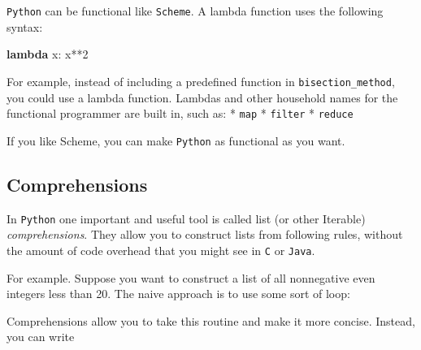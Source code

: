 \documentclass{article}
\newenvironment{Shaded}{}{}
\newcommand{\KeywordTok}[1]{\textcolor[rgb]{0.00,0.44,0.13}{\textbf{{#1}}}}
\newcommand{\DataTypeTok}[1]{\textcolor[rgb]{0.56,0.13,0.00}{{#1}}}
\newcommand{\DecValTok}[1]{\textcolor[rgb]{0.25,0.63,0.44}{{#1}}}
\newcommand{\NormalTok}[1]{{#1}}
\begin{document}
\texttt{Python} can be functional like \texttt{Scheme}. A lambda
function uses the following syntax:

\begin{Shaded}
\begin{Highlighting}[]
   \KeywordTok{lambda} \NormalTok{x: x**}\DecValTok{2}
\end{Highlighting}
\end{Shaded}

For example, instead of including a predefined function in
\texttt{bisection\_method}, you could use a lambda function. Lambdas and
other household names for the functional programmer are built in, such
as: * \texttt{map} * \texttt{filter} * \texttt{reduce}

If you like Scheme, you can make \texttt{Python} as functional as you
want.

\subsection{Comprehensions}\label{comprehensions}

In \texttt{Python} one important and useful tool is called list (or
other Iterable) \emph{comprehensions}. They allow you to construct lists
from following rules, without the amount of code overhead that you might
see in \texttt{C} or \texttt{Java}.

For example. Suppose you want to construct a list of all nonnegative
even integers less than 20. The naive approach is to use some sort of
loop:

\begin{Shaded}
\end{Shaded}

Comprehensions allow you to take this routine and make it more concise.
Instead, you can write

\begin{Shaded}
\end{Shaded}
\end{document}
